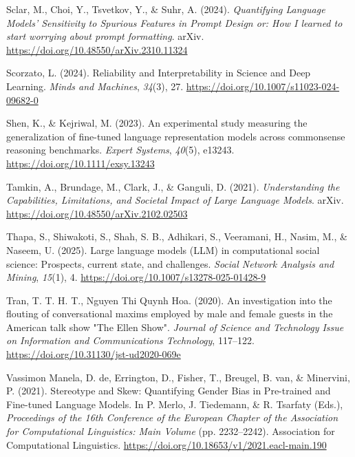 \documentclass[
  12pt,
]{article}
\newlength{\cslhangindent}
\newenvironment{CSLReferences}[2] %
 {\begin{list}{}{%
  \setlength{\itemindent}{0pt}
  \setlength{\leftmargin}{0pt}
  \setlength{\parsep}{0pt}
  \ifodd #1
   \setlength{\leftmargin}{\cslhangindent}
   \setlength{\itemindent}{-1\cslhangindent}
  \fi
  \setlength{\itemsep}{#2\baselineskip}}}
 {\end{list}}
\begin{document}
\begin{CSLReferences}{1}{0}
Sclar, M., Choi, Y., Tsvetkov, Y., \& Suhr, A. (2024). \emph{Quantifying {Language} {Models}' {Sensitivity} to {Spurious} {Features} in {Prompt} {Design} or: {How} {I} learned to start worrying about prompt formatting}. arXiv. \url{https://doi.org/10.48550/arXiv.2310.11324}

Scorzato, L. (2024). Reliability and {Interpretability} in {Science} and {Deep} {Learning}. \emph{Minds and Machines}, \emph{34}(3), 27. \url{https://doi.org/10.1007/s11023-024-09682-0}

Shen, K., \& Kejriwal, M. (2023). An experimental study measuring the generalization of fine-tuned language representation models across commonsense reasoning benchmarks. \emph{Expert Systems}, \emph{40}(5), e13243. \url{https://doi.org/10.1111/exsy.13243}

Tamkin, A., Brundage, M., Clark, J., \& Ganguli, D. (2021). \emph{Understanding the {Capabilities}, {Limitations}, and {Societal} {Impact} of {Large} {Language} {Models}}. arXiv. \url{https://doi.org/10.48550/arXiv.2102.02503}

Thapa, S., Shiwakoti, S., Shah, S. B., Adhikari, S., Veeramani, H., Nasim, M., \& Naseem, U. (2025). Large language models ({LLM}) in computational social science: Prospects, current state, and challenges. \emph{Social Network Analysis and Mining}, \emph{15}(1), 4. \url{https://doi.org/10.1007/s13278-025-01428-9}

Tran, T. T. H. T., Nguyen Thi Quynh Hoa. (2020). An investigation into the flouting of conversational maxims employed by male and female guests in the {American} talk show "{The} {Ellen} {Show}". \emph{Journal of Science and Technology Issue on Information and Communications Technology}, 117--122. \url{https://doi.org/10.31130/jst-ud2020-069e}

Vassimon Manela, D. de, Errington, D., Fisher, T., Breugel, B. van, \& Minervini, P. (2021). Stereotype and {Skew}: {Quantifying} {Gender} {Bias} in {Pre}-trained and {Fine}-tuned {Language} {Models}. In P. Merlo, J. Tiedemann, \& R. Tsarfaty (Eds.), \emph{Proceedings of the 16th {Conference} of the {European} {Chapter} of the {Association} for {Computational} {Linguistics}: {Main} {Volume}} (pp. 2232--2242). Association for Computational Linguistics. \url{https://doi.org/10.18653/v1/2021.eacl-main.190}


\end{CSLReferences}
\end{document}
